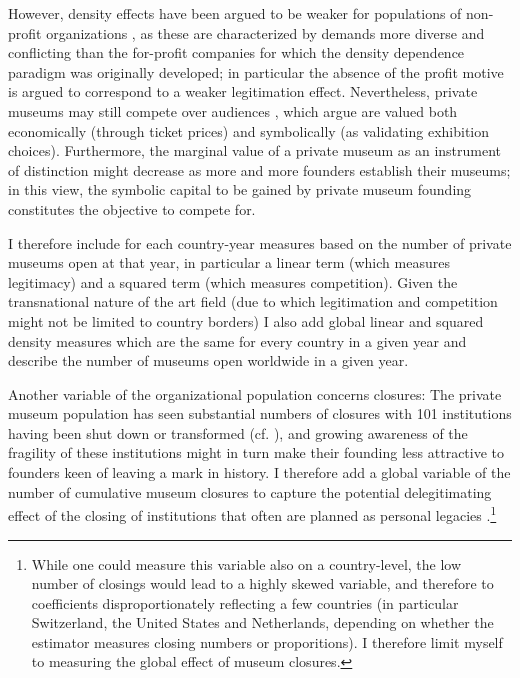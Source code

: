 \documentclass[11pt]{article}
\begin{document}
However, density effects have been argued to be weaker for populations of non-profit organizations \parencite{Bogaert_etal_2014_ecological}, as these are characterized by demands more diverse and conflicting than the for-profit companies for which the density dependence paradigm was originally developed; in particular the absence of the profit motive is argued to correspond to a weaker legitimation effect. 
Nevertheless, private museums may still compete over audiences \parencite[p.14]{Adam_2021_rise}, which \textcite{Frey_Meier_2002_beyeler} argue are valued both economically (through ticket prices) and symbolically (as validating exhibition choices).
Furthermore, the marginal value of a private museum as an instrument of distinction might decrease as more and more founders establish their museums; in this view, the symbolic capital to be gained by private museum founding constitutes the objective to compete for. 



I therefore include for each country-year measures based on the number of private museums open at that year, in particular a linear term (which measures legitimacy) and a squared term (which measures competition).
Given the transnational nature of the art field (due to which legitimation and competition might not be limited to country borders) I also add global linear and squared density measures which are the same for every country in a given year and describe the number of museums open worldwide in a given year.


Another variable of the organizational population concerns closures:
The private museum population has seen substantial numbers of closures with 101 institutions having been shut down or transformed (cf. \cite{Velthuis_Gera_forthcoming_fragility}), and growing awareness of the fragility of these institutions might in turn make their founding less attractive to founders keen of leaving a mark in history.
I therefore add a global variable of the number of cumulative museum closures to capture the potential delegitimating effect of the closing of institutions that often are planned as personal legacies \parencite{Walker_2019_collector}.\footnote{While one could measure this variable also on a country-level, the low number of closings would lead to a highly skewed variable, and therefore to coefficients disproportionately reflecting a few countries (in particular Switzerland, the United States and Netherlands, depending on whether the estimator measures closing numbers or proporitions). I therefore limit myself to measuring the global effect of museum closures.} 
\end{document}
